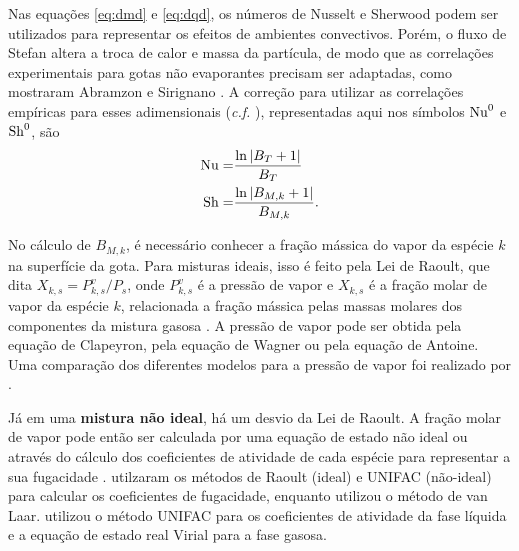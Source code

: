 Nas equações \eqref{eq:dmd} e \eqref{eq:dqd}, os números de Nusselt e Sherwood podem ser utilizados para representar os efeitos de ambientes convectivos.
Porém, o fluxo de Stefan altera a troca de calor e massa da partícula, de modo que as correlações experimentais para gotas não evaporantes precisam ser adaptadas, como mostraram Abramzon e Sirignano \cite{Sirignano1989}.
A correção para utilizar as correlações empíricas para esses adimensionais  (\emph{c.f.} \cite[eqs. (8) e (9)]{SacomanoF2025CF}), representadas aqui nos símbolos $\mathrm{Nu}^0$ e $\mathrm{Sh}^0$, são
\begin{align}
    \mathrm{Nu} =& \frac{\ln \left|B_T + 1\right|}{B_T} \\
    \mathrm{Sh} =& \frac{\ln \left|B_{M,k} + 1\right|}{B_{M,k}}.
\end{align}

No cálculo de $B_{M,k}$, é necessário conhecer a fração mássica do vapor da espécie $k$ na superfície da gota.
Para misturas ideais, isso é feito pela Lei de Raoult, que dita $X_{k,s}=P^v_{k,s}/P_s$, onde $P^v_{k,s}$ é a pressão de vapor e $X_{k,s}$ é a fração molar de vapor da espécie $k$, relacionada a fração mássica pelas massas molares dos componentes da mistura gasosa \cite{Peters2010}.
A pressão de vapor pode ser obtida pela equação de Clapeyron, pela equação de Wagner ou pela equação de Antoine.
Uma comparação dos diferentes modelos para a pressão de vapor foi realizado por \cite{SacomanoF2019IJHMT}.

Já em uma \textbf{mistura não ideal}, há um desvio da Lei de Raoult. 
A fração molar de vapor pode então ser calculada por uma equação de estado não ideal ou através do cálculo dos coeficientes de atividade de cada espécie para representar a sua fugacidade \cite{Bird2002}.
\cite{SacomanoF2022IJHMT} utilzaram os métodos de  Raoult (ideal) e UNIFAC (não-ideal) para calcular os coeficientes de fugacidade, enquanto \cite{SacomanoF2025CF} utilizou o método de van Laar.
\cite{ZanuttoC2019} utilizou o método UNIFAC para os coeficientes de atividade da fase líquida e a equação de estado real Virial para a fase gasosa.


